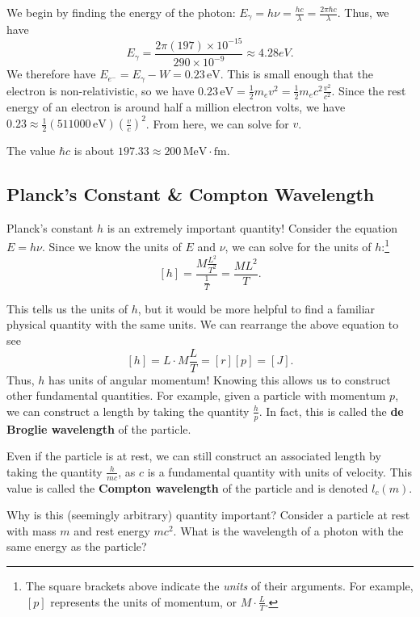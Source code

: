 \begin{framedansw}
    We begin by finding the energy of the photon: $E_{\gamma}=h\nu=\frac{hc}{\lambda}=\frac{2\pi\hbar c}{\lambda}$. Thus, we have $$E_{\gamma}=\frac{2\pi(197)\times 10^{-15}}{290\times 10^{-9}}\approx 4.28 eV.$$We therefore have $E_{e^-}=E_{\gamma}-W=0.23\,\text{eV}$. This is small enough that the electron is non-relativistic, so we have $0.23\,\text{eV}=\frac{1}{2}m_ev^2=\frac{1}{2}m_ec^2\frac{v^2}{c^2}$. Since the rest energy of an electron is around half a million electron volts, we have $0.23\approx\frac{1}{2}(511000\,\text{eV})(\frac{v}{c})^2$. From here, we can solve for $v$.
\end{framedansw}

\begin{framedtip*}
    The value $\hbar c$ is about $197.33\approx 200\,\text{MeV} \cdot \text{fm}$. 
\end{framedtip*}

\subsection{Planck's Constant \& Compton Wavelength} \label{compton_wavelength}

Planck's constant $h$ is an extremely important quantity! Consider the equation $E=h\nu$. Since we know the units of $E$ and $\nu$, we can solve for the units of $h$:\footnote{The square brackets above indicate the \textit{units} of their arguments. For example, $[p]$ represents the units of momentum, or $M\cdot\frac{L}{T}$.} $$[h]=\frac{M\frac{L^2}{T^2}}{\frac{1}{T}}=\frac{ML^2}{T}.$$

This tells us the units of $h$, but it would be more helpful to find a familiar physical quantity with the same units. We can rearrange the above equation to see $$[h]=L\cdot M\frac{L}{T}=[r][p]=[J].$$Thus, $h$ has units of angular momentum! Knowing this allows us to construct other fundamental quantities. For example, given a particle with momentum $p$, we can construct a length by taking the quantity $\frac{h}{p}$. In fact, this is called the \textbf{de Broglie wavelength} of the particle. 

Even if the particle is at rest, we can still construct an associated length by taking the quantity $\frac{h}{mc}$, as $c$ is a fundamental quantity with units of velocity. This value is called the \textbf{Compton wavelength} of the particle and is denoted $l_c(m)$. 

Why is this (seemingly arbitrary) quantity important? Consider a particle at rest with mass $m$ and rest energy $mc^2$. What is the wavelength of a photon with the same energy as the particle?

